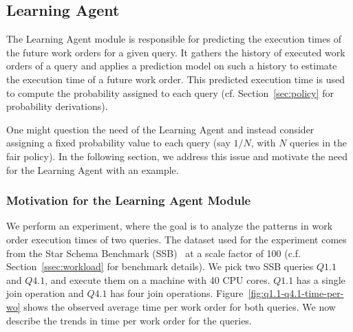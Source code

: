 \subsection{Learning Agent}\label{ssec:learning}
The Learning Agent module is responsible for predicting the execution times of the future work orders for a given query. 
It gathers the history of executed work orders of a query and applies a prediction model on such a history to estimate the execution time of a future work order.
This predicted execution time is used to compute the probability assigned to each query (cf. Section~\ref{sec:policy} for probability derivations).  

One might question the need of the Learning Agent and instead consider assigning a fixed probability value to each query (say $1/N$, with $N$ queries in the fair policy).
In the following section, we address this issue and motivate the need for the Learning Agent with an example. 

\subsubsection{Motivation for the Learning Agent Module}
We perform an experiment, where the goal is to analyze the patterns in work order execution times of two queries. 
The dataset used for the experiment comes from the Star Schema Benchmark (SSB)~\cite{ssb} 
at a scale factor of 100 (c.f. Section~\ref{ssec:workload} for benchmark details).
We pick two SSB queries $Q1.1$ and $Q4.1$, and execute them on a machine with 40 CPU cores. 
$Q1.1$ has a single join operation and $Q4.1$ has four join operations.
Figure~\ref{fig:q1.1-q4.1-time-per-wo} shows the observed average time per work order for both queries.
We now describe the trends in time per work order for the queries.

